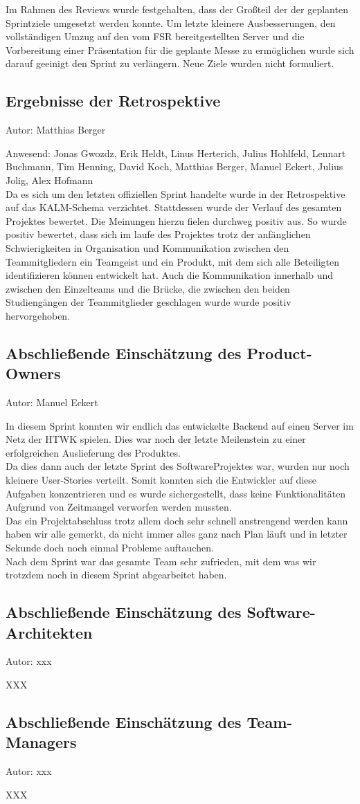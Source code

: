 Im Rahmen des Reviews wurde festgehalten, dass der Großteil der der geplanten  Sprintziele umgesetzt werden konnte. Um letzte kleinere Ausbesserungen, den vollständigen Umzug auf den vom FSR bereitgestellten Server und die Vorbereitung einer Präsentation für die geplante Messe zu ermöglichen wurde sich darauf geeinigt den Sprint zu verlängern. Neue Ziele wurden nicht formuliert.

\subsection{Ergebnisse der Retrospektive}
{\small Autor: Matthias Berger}

Anwesend: Jonas Gwozdz, Erik Heldt, Linus Herterich, Julius Hohlfeld, Lennart Buchmann, Tim Henning, David Koch, Matthias Berger, Manuel Eckert, Julius Jolig, Alex Hofmann\\

Da es sich um den letzten offiziellen Sprint handelte wurde in der Retrospektive auf das KALM-Schema verzichtet. Stattdessen wurde der Verlauf des gesamten Projektes bewertet. Die Meinungen hierzu fielen durchweg positiv aus. So wurde  positiv bewertet, dass sich im laufe des Projektes trotz der anfänglichen Schwierigkeiten in Organisation und Kommunikation zwischen den Teammitgliedern ein Teamgeist und ein Produkt, mit dem sich alle Beteiligten identifizieren können entwickelt hat. Auch die Kommunikation innerhalb und zwischen den Einzelteams und die Brücke, die zwischen den beiden Studiengängen der Teammitglieder geschlagen wurde wurde positiv hervorgehoben.

\subsection{Abschließende Einschätzung des Product-Owners}
{\small Autor: Manuel Eckert}

In diesem Sprint konnten wir endlich das entwickelte Backend auf einen Server im Netz der HTWK spielen. Dies war noch der letzte Meilenstein zu einer erfolgreichen Auslieferung des Produktes. \\
Da dies dann auch der letzte Sprint des SoftwareProjektes war, wurden nur noch kleinere User-Stories verteilt. Somit konnten sich die Entwickler auf diese Aufgaben konzentrieren und es wurde sichergestellt, dass keine Funktionalitäten Aufgrund von Zeitmangel verworfen werden mussten. \\
Das ein Projektabschluss trotz allem doch sehr schnell anstrengend werden kann haben wir alle gemerkt, da nicht immer alles ganz nach Plan läuft und in letzter Sekunde doch noch einmal Probleme auftauchen. \\
Nach dem Sprint war das gesamte Team sehr zufrieden, mit dem was wir trotzdem noch in diesem Sprint abgearbeitet haben. \\ 

\subsection{Abschließende Einschätzung des Software-Architekten}
{\small Autor: xxx}

XXX

\subsection{Abschließende Einschätzung des Team-Managers}
{\small Autor: xxx}

XXX